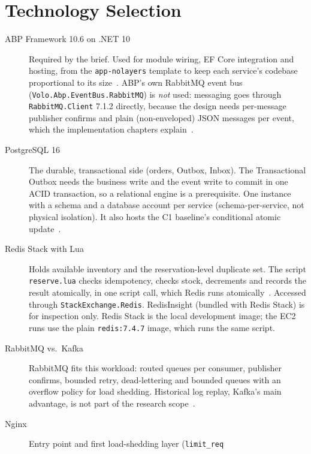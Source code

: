 \documentclass[a4paper]{report}
\begin{document}
\chapter{Technology Selection}
\label{sec:technology}

\begin{description}
  \item[ABP Framework 10.6 on .NET 10] Required by the brief. Used for module
    wiring, EF Core integration and hosting, from the \texttt{app-nolayers}
    template to keep each service's codebase proportional to its
    size~\cite{abp-docs,dotnet10}. ABP's
    own RabbitMQ event bus (\texttt{Volo.Abp.\allowbreak EventBus.\allowbreak RabbitMQ}) is
    \emph{not} used: messaging goes through \texttt{RabbitMQ.Client} 7.1.2
    directly, because the design needs per-message publisher confirms and plain
    (non-enveloped) JSON messages per event, which the implementation chapters
    explain~\cite{rmq-dotnet}.
  \item[PostgreSQL 16] The durable, transactional side (orders, Outbox,
    Inbox). The Transactional Outbox needs the business write and the event
    write to commit in one ACID transaction, so a relational engine is a
    prerequisite. One instance with a schema and a database account per
    service (schema-per-service, not physical isolation). It also hosts the C1
    baseline's conditional atomic update~\cite{pg-isolation,pg-locking}.
  \item[Redis Stack with Lua] Holds available inventory and the
    reservation-level duplicate set. The script \texttt{reserve.lua} checks
    idempotency, checks stock, decrements and records the result atomically,
    in one script call, which Redis runs atomically~\cite{redis-lua,redis-eval}.
    Accessed through \texttt{Stack\allowbreak Exchange.\allowbreak Redis}.
    RedisInsight (bundled with Redis Stack) is for inspection only. Redis Stack is the local development image; the EC2 runs use the plain \texttt{redis:7.4.7} image, which runs the same script.
  \item[RabbitMQ vs.\ Kafka] RabbitMQ fits this workload: routed queues per
    consumer, publisher confirms, bounded retry, dead-lettering and bounded
    queues with an overflow policy for load shedding. Historical log replay,
    Kafka's main advantage, is not part of the research
    scope~\cite{rmq-confirms,rmq-dlx,rmq-maxlength}.
  \item[Nginx] Entry point and first load-shedding layer (\texttt{limit\_req}

\end{description}
\end{document}
